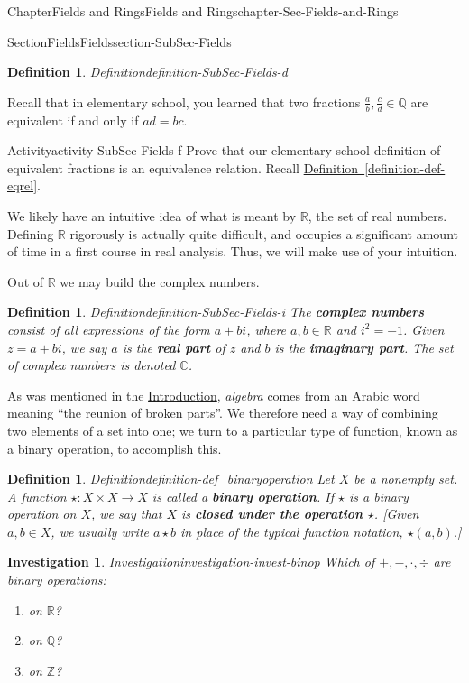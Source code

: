 \documentclass[oneside,10pt,]{book}
\newcommand{\xreffont}{\relax}
\newcommand{\terminology}[1]{\textbf{#1}}
\numberwithin{equation}{section}
\def\C{{\mathbb C}}
\def\Z{{\mathbb Z}}
\def\Q{{\mathbb Q}}
\def\R{{\mathbb R}}
\newtheorem{definition}[theorem]{Definition}
\newtheorem{investigation}[theorem]{Investigation}
\begin{document}
\begin{chapterptx}{Chapter}{Fields and Rings}{}{Fields and Rings}{}{}{chapter-Sec-Fields-and-Rings}
\begin{sectionptx}{Section}{Fields}{}{Fields}{}{}{section-SubSec-Fields}
\begin{definition}{Definition}{}{definition-SubSec-Fields-d}
%
\end{definition}
Recall that in elementary school, you learned that two fractions \(\frac{a}{b}, \frac{c}{d} \in \Q\) are equivalent if and only if \(ad=bc\).%
\begin{activity}{Activity}{}{activity-SubSec-Fields-f}%
Prove that our elementary school definition of equivalent fractions is an equivalence relation. Recall \hyperref[definition-def-eqrel]{Definition~{\xreffont\ref{definition-def-eqrel}}}.%
\end{activity}%
We likely have an intuitive idea of what is meant by \(\R\), the set of real numbers. Defining \(\R\) rigorously is actually quite difficult, and occupies a significant amount of time in a first course in real analysis. Thus, we will make use of your intuition. %
\par
Out of \(\R\) we may build the complex numbers.%
\begin{definition}{Definition}{}{definition-SubSec-Fields-i}%
The \terminology{complex numbers} consist of all expressions of the form \(a+bi\), where \(a,b\in \R\) and \(i^2 = -1\). Given \(z = a+bi\), we say \(a\) is the \terminology{real part} of \(z\) and \(b\) is the \terminology{imaginary part}. The set of complex numbers is denoted \(\C\).%
\end{definition}
As was mentioned in the \hyperref[preface-Sec-Introduction]{Introduction}, \emph{algebra} comes from an Arabic word meaning ``the reunion of broken parts''. We therefore need a way of combining two elements of a set into one; we turn to a particular type of function, known as a binary operation, to accomplish this.%
\begin{definition}{Definition}{}{definition-def_binaryoperation}%
%
 Let \(X\) be a nonempty set. A function \(\star : X \times X \to X\) is called a \terminology{binary operation}. If \(\star\) is a binary operation on \(X\), we say that \(X\) is \terminology{closed under the operation \(\star\)}. [Given \(a,b\in X\), we usually write \(a\star b\) in place of the typical function notation, \(\star(a,b)\).]%
\end{definition}
\begin{investigation}{Investigation}{}{investigation-invest-binop}%
Which of \(+, -, \cdot, \div\) are binary operations:%
\begin{enumerate}
\item{}on \(\R\)?%
\item{}on \(\Q\)?%
\item{}on \(\Z\)?%

\end{enumerate}
\end{investigation}
\end{sectionptx}
\end{chapterptx}
\end{document}
